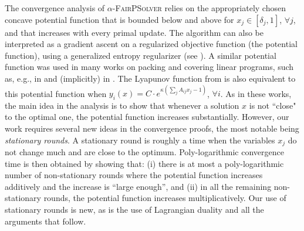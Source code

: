 \documentclass[11pt]{article}
\makeatletter
\renewcommand{\paragraph}{\@startsection{paragraph}{4}{\z@}{1ex \@plus 1ex \@minus .2ex}{-.5em}{\normalfont\normalsize\bfseries}}
\makeatother
\begin{document}
\paragraph{Convergence Argument.}
The convergence analysis of \textsc{$\alpha$-FairPSolver} relies on the appropriately chosen concave potential function that is bounded below and above for $x_j\in[\delta_j, 1]$, $\forall j$, and that increases with every primal update. The algorithm can also be interpreted as a gradient ascent on a regularized objective function (the potential function), using a generalized entropy regularizer (see \cite{d-allen2014using, c-allen2015nearly}). A  similar potential function was used in many works on packing and covering linear programs, such as, e.g., in \cite{AwerbuchKhandekar2009} and (implicitly) in \cite{dc-young2001sequential}. The Lyapunov function from \cite{kelly1998rate} is also equivalent to this potential function when $y_i(x) = C\cdot e^{\kappa(\sum_jA_{ij}x_j - 1)}$, $\forall i$.  As in these works, the 
main idea in the analysis is to show that whenever a solution $x$ is not ``close" to the optimal one, the potential function increases substantially.
However, our work requires several new ideas in the convergence proofs, the most notable being 
{\em stationary rounds}. A stationary round is roughly a time when the variables $x_j$ do not change much and are close to the optimum. Poly-logarithmic convergence time is then obtained by showing that: (i) there is at most a poly-logarithmic number of non-stationary rounds where the potential function increases additively and the increase is ``large enough'', and (ii) in all the remaining non-stationary rounds, the potential function increases multiplicatively. 
Our use of stationary rounds is new, as is the use of Lagrangian duality and all the arguments that follow.  
\end{document}
